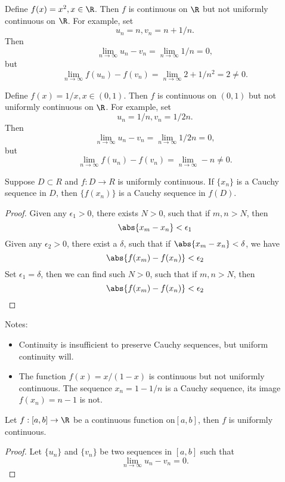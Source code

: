 \begin{refsection}
\begin{example}
	Define $f(x) = x^2, x\in \R$. Then $f$ is continuous on $\R$ but not uniformly continuous on $\R$.	
	For example, set
	$$u_n = n, v_n = n + 1/n.$$
	Then $$\lim_{n\to \infty} u_n - v_n = \lim_{n\to \infty} 1/n =0,$$
	but
	$$\lim_{n\to \infty} f(u_n) - f(v_n) = \lim_{n\to \infty} 2 + 1/n^2 =2\neq 0.$$
\end{example}


\begin{example}
	Define $f(x) = 1/x, x\in (0,1)$. Then $f$ is continuous on $(0,1)$ but not uniformly continuous on $\R$.	
	For example, set
	$$u_n = 1/n, v_n = 1/2n.$$
	Then $$\lim_{n\to \infty} u_n - v_n = \lim_{n\to \infty} 1/2n =0,$$
	but
	$$\lim_{n\to \infty} f(u_n) - f(v_n) = \lim_{n\to \infty} -n \neq 0.$$	
\end{example}


\begin{lemma}
	Suppose $D\subset R$ and $f:D\to R$ is uniformly continuous. If $\{x_n\}$ is a Cauchy sequence in $D$, then $\{f(x_n)\}$ is a Cauchy sequence in $f(D)$.
\end{lemma}	
\begin{proof}Given any $\epsilon_1 > 0$, there exists $N>0$, such that if $m,n>N$, then
	$$\abs{x_m-x_n} < \epsilon_1$$
	Given any $\epsilon_2 > 0$, there exist a $\delta$, such that
	if $\abs{x_m-x_n} < \delta$, we have
	$$\abs{f(x_m)-f(x_n)} < \epsilon_2$$
	Set $\epsilon_1 = \delta$, then we can find such $N>0$, such that if $m,n>N$, then
	$$\abs{f(x_m)-f(x_n)} < \epsilon_2$$
\end{proof}


\begin{remark}
	Notes:
	\begin{itemize}
		\item Continuity is insufficient to preserve Cauchy sequences, but uniform continuity will. 		
		\item The function $f(x)=x/(1-x)$ is continuous but not uniformly continuous. The sequence $x_n = 1-1/n$ is a Cauchy sequence, its image $f(x_n)=n-1$ is not. \cite{carter2001foundations}
	\end{itemize}
\end{remark}


\begin{lemma}\cite[68]{fitzpatrick2006advanced}
Let $f:[a,b]\to \R$ be a continuous function on$[a,b]$, then $f$ is uniformly continuous.	
\end{lemma}
\begin{proof}
Let $\{u_n\}$ and $\{v_n\}$ be two sequences in $[a,b]$ such that $$\lim_{n\to \infty} u_n - v_n = 0.$$


\end{proof}
\end{refsection}
